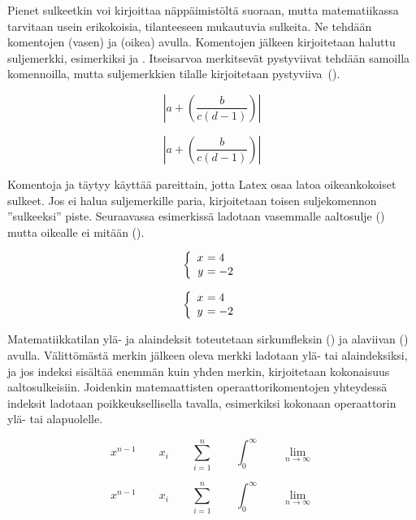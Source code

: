 Pienet sulkeetkin voi kirjoittaa näppäimistöltä suoraan, mutta
matematiikassa tarvitaan usein erikokoisia, tilanteeseen mukautuvia
sulkeita. Ne tehdään komentojen  (vasen) ja
 (oikea) avulla. Komentojen jälkeen kirjoitetaan haluttu
suljemerkki, esimerkiksi \mkomentojatko{(} ja
\mkomentojatko{)}. Itseisarvoa merkitsevät pystyviivat
tehdään samoilla komennoilla, mutta suljemerkkien tilalle kirjoitetaan
pystyviiva~(\koodi{|}).

\begin{koodilohkosis}
\[ \left| a + \left( \frac{b}{c \left( d-1 \right)} \right) \right| \]
\end{koodilohkosis}
\[ \left| a + \left( \frac{b}{c \left( d-1 \right)} \right) \right| \]

\noindent
Komentoja  ja  täytyy käyttää pareittain,
jotta Latex osaa latoa oikeankokoiset sulkeet. Jos ei halua
suljemerkille paria, kirjoitetaan toisen suljekomennon ''sulkeeksi''
piste. Seuraavassa esimerkissä ladotaan vasemmalle aaltosulje
(\mkomentojatko{\keno\{}) mutta oikealle ei mitään
().

\begin{koodilohkosis}
\[ \left\{ \begin{array}{r@{~}l}
             x &= 4 \\
             y &= -2 \\
           \end{array} \right. \]
\end{koodilohkosis}
\[ \left\{ \begin{array}{l@{~}l}
             x &= 4 \\
             y &= -2 \\
           \end{array} \right. \]

\noindent
Matematiikkatilan ylä- ja alaindeksit toteutetaan sirkumfleksin
(\koodi{\^{}}) ja alaviivan (\koodi{\_}) avulla. Välittömästä merkin
jälkeen oleva merkki ladotaan ylä- tai alaindeksiksi, ja jos indeksi
sisältää enemmän kuin yhden merkin, kirjoitetaan kokonaisuus
aaltosulkeisiin. Joidenkin matemaattisten operaattorikomentojen
yhteydessä indeksit ladotaan poikkeuksellisella tavalla, esimerkiksi
kokonaan operaattorin ylä- tai alapuolelle.

\begin{koodilohkosis}
\[ x^{n-1} \qquad x_i \qquad \sum_{i=1}^n \qquad
  \int_0^\infty \qquad \lim_{n \to \infty} \]
\end{koodilohkosis}
\[ x^{n-1} \qquad x_i \qquad \sum_{i=1}^n \qquad
  \int_0^\infty \qquad \lim_{n \to \infty} \]

